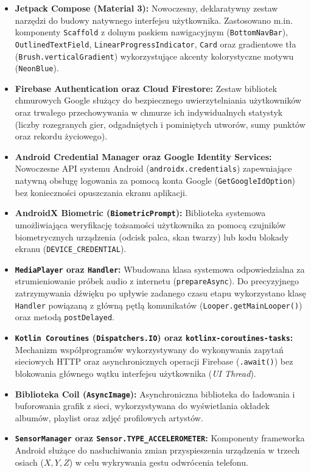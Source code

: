 \begin{itemize}
    \item \textbf{Jetpack Compose (Material 3):} Nowoczesny, deklaratywny zestaw narzędzi do budowy natywnego interfejsu użytkownika. Zastosowano m.in. komponenty \texttt{Scaffold} z dolnym paskiem nawigacyjnym (\texttt{BottomNavBar}), \texttt{OutlinedTextField}, \texttt{LinearProgressIndicator}, \texttt{Card} oraz gradientowe tła (\texttt{Brush.verticalGradient}) wykorzystujące akcenty kolorystyczne motywu (\texttt{NeonBlue}).
    \item \textbf{Firebase Authentication oraz Cloud Firestore:} Zestaw bibliotek chmurowych Google służący do bezpiecznego uwierzytelniania użytkowników oraz trwałego przechowywania w chmurze ich indywidualnych statystyk (liczby rozegranych gier, odgadniętych i pominiętych utworów, sumy punktów oraz rekordu życiowego).
    \item \textbf{Android Credential Manager oraz Google Identity Services:} Nowoczesne API systemu Android (\texttt{androidx.credentials}) zapewniające natywną obsługę logowania za pomocą konta Google (\texttt{GetGoogleIdOption}) bez konieczności opuszczania ekranu aplikacji.
    \item \textbf{AndroidX Biometric (\texttt{BiometricPrompt}):} Biblioteka systemowa umożliwiająca weryfikację tożsamości użytkownika za pomocą czujników biometrycznych urządzenia (odcisk palca, skan twarzy) lub kodu blokady ekranu (\texttt{DEVICE\_CREDENTIAL}).
    \item \textbf{\texttt{MediaPlayer} oraz \texttt{Handler}:} Wbudowana klasa systemowa odpowiedzialna za strumieniowanie próbek audio z internetu (\texttt{prepareAsync}). Do precyzyjnego zatrzymywania dźwięku po upływie zadanego czasu etapu wykorzystano klasę \texttt{Handler} powiązaną z główną pętlą komunikatów (\texttt{Looper.getMainLooper()}) oraz metodą \texttt{postDelayed}.
    \item \textbf{\texttt{Kotlin Coroutines} (\texttt{Dispatchers.IO}) oraz \texttt{kotlinx-coroutines-tasks}:} Mechanizm współprogramów wykorzystywany do wykonywania zapytań sieciowych HTTP oraz asynchronicznych operacji Firebase (\texttt{.await()}) bez blokowania głównego wątku interfejsu użytkownika (\textit{UI Thread}).
    \item \textbf{Biblioteka Coil (\texttt{AsyncImage}):} Asynchroniczna biblioteka do ładowania i buforowania grafik z sieci, wykorzystywana do wyświetlania okładek albumów, playlist oraz zdjęć profilowych artystów.
    \item \textbf{\texttt{SensorManager} oraz \texttt{Sensor.TYPE\_ACCELEROMETER}:} Komponenty frameworka Android służące do nasłuchiwania zmian przyspieszenia urządzenia w trzech osiach ($X, Y, Z$) w celu wykrywania gestu odwrócenia telefonu.
\end{itemize}

